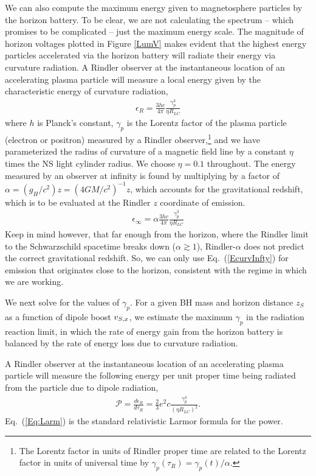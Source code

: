 We can also compute the maximum energy given to magnetosphere
particles by the horizon battery. To be clear, we are not calculating
the spectrum -- which promises to be complicated -- just the maximum energy 
scale. The magnitude of horizon voltages
plotted in Figure \ref{LumV} makes evident that the highest energy
particles accelerated via the horizon battery will radiate their
energy via curvature radiation.  A Rindler observer at the
instantaneous location of an accelerating plasma particle will measure
a local energy given by the characteristic energy of curvature
radiation,
\begin{align}
\epsilon_{R} = \frac{3hc}{4 \pi} \frac{\gamma^3_p}{\eta R_{LC}}
\label{Ecurv}
\end{align}
where $h$ is Planck's constant, $\gamma_p$ is the Lorentz
factor of the plasma particle (electron or positron) measured by a
Rindler observer,\footnote{The Lorentz factor in units of Rindler 
proper time are related to the Lorentz factor in units of universal time by
$\gamma_p(\tau_R) = \gamma_p(t)/\alpha$.} and we have 
parameterized the radius of curvature of a magnetic field line by a 
constant $\eta$ times the NS light cylinder radius. We choose $\eta=0.1$ throughout.
The energy measured by an observer at infinity is found by multiplying
by a factor of $\alpha = (g_H/c^2)  z = (4GM/c^2)^{-1} z$, which
accounts for the gravitational redshift, which is to be evaluated at the
Rindler $z$ coordinate of emission.
\begin{align}
\epsilon_{\infty} = \alpha \frac{3hc}{4 \pi} \frac{\gamma^3_p}{\eta R_{LC}}
\label{EcurvInfty}
\end{align}
Keep in mind however, that far enough from the horizon, where the
Rindler limit to the Schwarzschild spacetime breaks down ($\alpha
\gtrsim 1$), Rindler-$\alpha$ does not predict the correct gravitational
redshift. So, we can only use Eq.\ (\ref{EcurvInfty}) for emission
that originates close to the horizon, consistent with the regime in
which we are working.

We next solve for the values of $\gamma_p$. For a given BH mass and
horizon distance $z_S$ as a function of dipole boost $v_{S, x}$, we
estimate the maximum $\gamma_p$ in the radiation reaction limit, in
which the rate of energy gain from the horizon battery is balanced by
the rate of energy loss due to curvature radiation. 

A Rindler observer at the instantaneous location of an accelerating plasma particle will measure the following energy per unit proper time being radiated from the particle due to dipole radiation,
\begin{align}
\mathcal{P} = \frac{d \epsilon_R}{d\tau_R} = \frac{2}{3} e^2 c
\frac{\gamma^4_p}{(\eta R_{LC})^2}. 
\label{Eq:Larm}
\end{align} 
Eq.\  (\ref{Eq:Larm}) is the standard relativistic Larmor formula for
the power.


